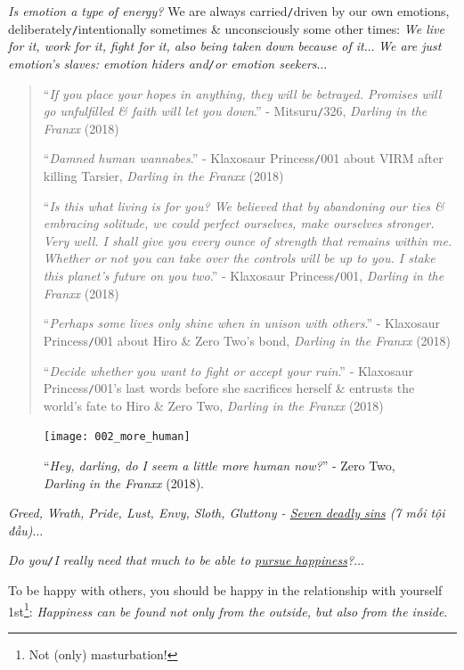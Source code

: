 \documentclass[12pt]{article}
\begin{document}
{\it Is emotion a type of energy?} We are always carried{\tt/}driven by our own emotions, deliberately{\tt/}intentionally sometimes \& unconsciously some other times: {\it We live for it, work for it, fight for it, also being taken down because of it}$\ldots$ {\it We are just emotion's slaves: emotion hiders and{\tt/}or emotion seekers}$\ldots$
\begin{quotation}
	``{\it If you place your hopes in anything, they will be betrayed. Promises will go unfulfilled \& faith will let you down}.'' - Mitsuru{\tt/}326, {\it {\sc Darling} in the {\sc Franxx}} (2018)
	
	``{\it Damned human wannabes}.'' - Klaxosaur Princess{\tt/}001 about VIRM after killing Tarsier, {\it {\sc Darling} in the {\sc Franxx}} (2018)
	
	``{\it Is this what living is for you? We believed that by abandoning our ties \& embracing solitude, we could perfect ourselves, make ourselves stronger. Very well. I shall give you every ounce of strength that remains within me. Whether or not you can take over the controls will be up to you. I stake this planet's future on you two}.'' - Klaxosaur Princess{\tt/}001, {\it {\sc Darling} in the {\sc Franxx}} (2018)
	
	``{\it Perhaps some lives only shine when in unison with others}.'' - Klaxosaur Princess{\tt/}001 about Hiro \& Zero Two's bond, {\it {\sc Darling} in the {\sc Franxx}} (2018)
	
	``{\it Decide whether you want to fight or accept your ruin}.'' - Klaxosaur Princess{\tt/}001's last words before she sacrifices herself \& entrusts the world's fate to Hiro \& Zero Two, {\it {\sc Darling} in the {\sc Franxx}} (2018)
\end{quotation}

\begin{figure}[h]
	\centering
	\texttt{[image: 002\_more\_human]}
	\caption{``{\it Hey, darling, do I seem a little more human now?}'' - Zero Two, {\it {\sc Darling} in the {\sc Franxx}} (2018).}
	\label{fig5}
\end{figure}
{\it Greed, Wrath, Pride, Lust, Envy, Sloth, Gluttony - \href{https://en.wikipedia.org/wiki/Seven_deadly_sins}{Seven deadly sins} (7 mối tội đầu)}$\ldots$

{\it Do you{\tt/}I really need that much to be able to \href{https://www.imdb.com/title/tt0454921/}{pursue happiness}?}$\ldots$

To be happy with others, you should be happy in the relationship with yourself 1st\footnote{Not (only) masturbation!}: {\it Happiness can be found not only from the outside, but also from the inside}.
\end{document}
